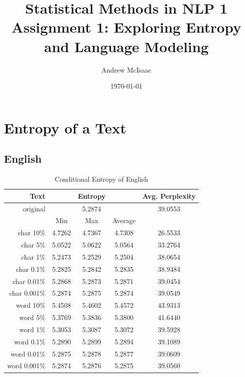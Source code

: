 \documentclass[a4paper]{article}
\title{Statistical Methods in NLP 1\\
Assignment 1: Exploring Entropy and Language Modeling}
\date{\today}
\author{Andrew McIsaac}
\begin{document}
\maketitle
\tableofcontents

\section{Entropy of a Text}
\label{sec:entropy}

\subsection{English}

\begin{table}[H]
    \centering
    \caption{Conditional Entropy of English\\}
    \label{tab:en_entropy}
    \begin{tabular}{r|ccc|c}
        Text & & Entropy & & Avg. Perplexity \\
        \hline
        original & & 5.2874 & & 39.0553\\
        \hline
             & Min & Max & Average & \\
        \hline
        char {10\%} & 4.7262 & 4.7367 & 4.7308 & 26.5533 \\
        char {5\%} & 5.0522 & 5.0622 & 5.0564 & 33.2764 \\
        char {1\%} & 5.2473 & 5.2529 & 5.2504 & 38.0654 \\
        char {0.1\%} & 5.2825 & 5.2842 & 5.2835 & 38.9484 \\
        char {0.01\%} & 5.2868 & 5.2873 & 5.2871 & 39.0454 \\
        char {0.001\%} & 5.2874 & 5.2875 & 5.2874 & 39.0549 \\
        \hline
        word {10\%} & 5.4508 & 5.4602 & 5.4572 & 43.9313 \\
        word {5\%} & 5.3769 & 5.3836 & 5.3800 & 41.6440 \\
        word {1\%} & 5.3053 & 5.3087 & 5.3072 & 39.5928 \\
        word {0.1\%} & 5.2890 & 5.2899 & 5.2894 & 39.1089 \\
        word {0.01\%} & 5.2875 & 5.2878 & 5.2877 & 39.0609 \\
        word {0.001\%} & 5.2874 & 5.2876 & 5.2875 & 39.0560 \\
    \end{tabular}
\end{table}
\end{document}
